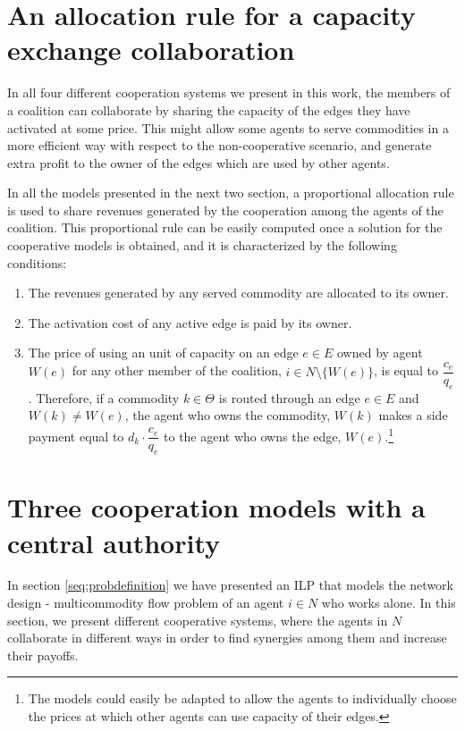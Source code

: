 \documentclass{article}
\begin{document}
\section{An allocation rule for a capacity exchange collaboration}
\label{seq:allocrule}
In all four different cooperation systems we present in this work, the members of a coalition can collaborate by sharing the capacity of the edges they have activated at some price. This might allow some agents to serve commodities in a more efficient way with respect to the non-cooperative scenario, and generate extra profit to the owner of the edges which are used by other agents.

In all the models presented in the next two section, a proportional allocation rule is used to share revenues generated by the cooperation among the agents of the coalition. This proportional rule can be easily computed once a solution for the cooperative models is obtained, and it is characterized by the following conditions:
\begin{enumerate}
    \item The revenues generated by any served commodity are
    allocated to its owner.
    \item The activation cost of any active edge is paid by its owner.
    \item The price of using an unit of capacity on an edge $e\in E$ owned by agent $W(e)$ for any other member of the coalition, $i\in N\setminus\{W(e)\}$, is equal to $\dfrac{c_e}{q_e}$. Therefore,  if a commodity $k\in \Theta$ is routed through an edge $e	\in E$ and $W(k)\not = W(e)$, the agent who owns the commodity, $W(k)$ makes a side payment equal to $d_k \cdot\dfrac{c_e}{q_e}$ to the agent who owns the edge, $W(e)$.\footnote{The models could easily be adapted to allow the agents to individually choose the prices at which other agents can use capacity of their edges.}
\end{enumerate}

\section{Three cooperation models with a central authority} \label{seq:centrmodels}

In section \ref{seq:probdefinition} we have presented an ILP that models the network design - multicommodity flow problem of an agent $i\in N$ who works alone. In this section, we present different cooperative systems, where the agents in $N$ collaborate in different ways in order to find synergies among them and increase their payoffs.
\end{document}
